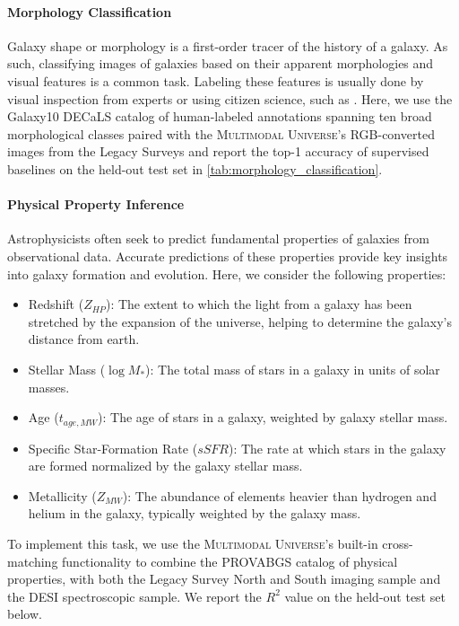 \documentclass[dvipsnames,table]{article}
\newcommand\pile{\textsc{Multimodal Universe}\xspace}
\begin{document}
\paragraph{Morphology Classification} Galaxy shape or morphology is a first-order tracer of the history of a galaxy. As such, classifying images of galaxies based on their apparent morphologies and visual features is a common task. Labeling these features is usually done by visual inspection from experts or using citizen science, such as \cite{gzchallengeKaggle2013,Walmsley2023GZDESI}. 
Here, we use the Galaxy10 DECaLS catalog of human-labeled annotations spanning ten broad morphological classes paired with the \pile's RGB-converted images from the Legacy Surveys and report the top-1 accuracy of supervised baselines on the held-out test set in \autoref{tab:morphology_classification}. 

\paragraph{Physical Property Inference}
Astrophysicists often seek to predict fundamental properties of galaxies from observational data. Accurate predictions of these properties provide key insights into galaxy formation and evolution. Here, we consider the following properties: 
\begin{itemize}[topsep=0pt,itemsep=-1ex,partopsep=1ex,parsep=1ex]
    \item Redshift ($Z_{HP}$): The extent to which the light from a galaxy has been stretched by the expansion of the universe, helping to determine the galaxy's distance from earth.
    \item Stellar Mass ($\log M_*$): The total mass of stars in a galaxy in units of solar masses.
    \item Age ($t_{age, MW}$): The age of stars in a galaxy, weighted by galaxy stellar mass.
    \item Specific Star-Formation Rate ($sSFR$): The rate at which stars in the galaxy are formed normalized by the galaxy stellar mass. 
    \item Metallicity ($Z_{MW}$): The abundance of elements heavier than hydrogen and helium in the galaxy, typically weighted by the galaxy mass.
\end{itemize}

To implement this task, we use the \pile's built-in cross-matching functionality to combine the PROVABGS catalog of physical properties, with both the Legacy Survey North and South imaging sample and the DESI spectroscopic sample. %
We report the $R^2$ value on the held-out test set below. 
\end{document}
